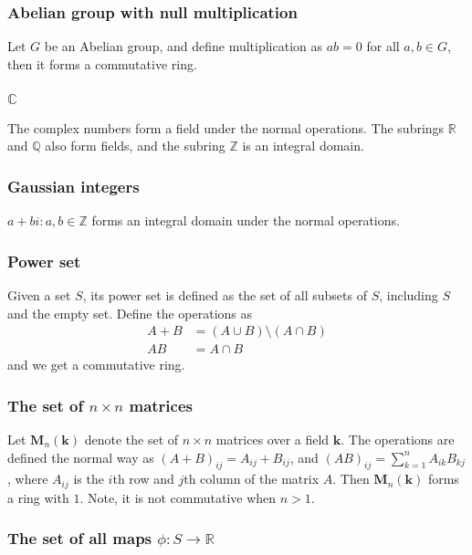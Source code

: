 \documentclass{article}
\theoremstyle{definition}
\begin{document}
  \subsubsection{Abelian group with null multiplication}
  Let $G$ be an Abelian group, and define multiplication as $ab = 0$ for all $a, b \in G$,
  then it forms a commutative ring.

  \subsubsection{$\mathbb{C}$}
  The complex numbers form a field under the normal operations. The subrings
  $\mathbb{R}$ and $\mathbb{Q}$ also form fields, and the subring $\mathbb{Z}$
  is an integral domain.

  \subsubsection{Gaussian integers}
  ${a + bi : a, b \in \mathbb{Z}}$ forms an integral domain under the normal operations.

  \subsubsection{Power set}
  Given a set $S$, its power set is defined as the set of all subsets of $S$,
  including $S$ and the empty set. Define the operations as
  \begin{align*}
    A + B &= (A \cup B) \setminus (A \cap B)\\
    AB &= A \cap B
  \end{align*}
  and we get a commutative ring.

  \subsubsection{The set of $n \times n$ matrices}
  Let $\mathbf{M}_{n}(\mathbf{k})$ denote the set of $n \times n$ matrices over
  a field $\mathbf{k}$. The operations are defined the normal way as $(A +
  B)_{ij} = A_{ij} + B_{ij}$, and $(AB)_{ij} = \sum_{k=1}^{n} A_{ik} B_{kj}$,
  where $A_{ij}$ is the $i$th row and $j$th column of the matrix $A$. Then
  $\mathbf{M}_{n}(\mathbf{k})$ forms a ring with $1$. Note, it is not
  commutative when $n > 1$.

  \subsubsection{The set of all maps $\phi : S \to \mathbb{R}$}


\end{document}
